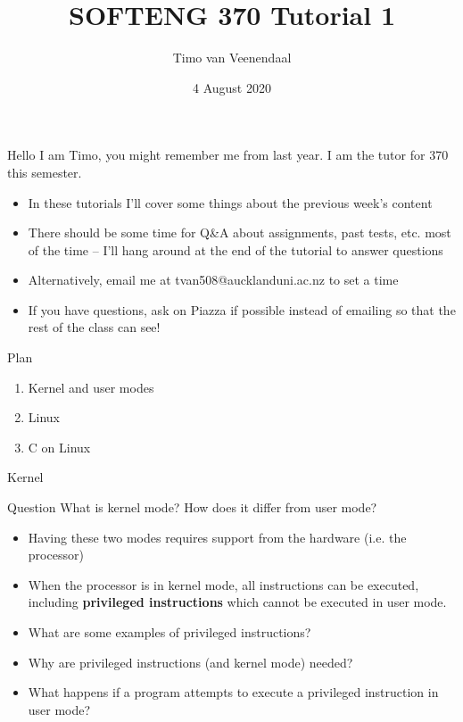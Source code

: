 \documentclass[notes]{beamer}
\title{SOFTENG 370 Tutorial 1}
\author{Timo van Veenendaal}
\date{4 August 2020}
\begin{document}
\maketitle

\begin{frame}{Hello}
I am Timo, you might remember me from last year. I am the tutor for 370 this semester.
    \begin{itemize}
        \item In these tutorials I'll cover some things about the previous week's content
        \item There should be some time for Q\&A about assignments, past tests, etc. most of the time -- I'll hang around at the end of the tutorial to answer questions
        \item Alternatively, email me at tvan508@aucklanduni.ac.nz to set a time
        \item If you have questions, ask on Piazza if possible instead of emailing so that the rest of the class can see!
    \end{itemize}
\end{frame}
\begin{frame}{Plan}
    \begin{enumerate}
        \item Kernel and user modes
        \item Linux
        \item C on Linux
    \end{enumerate}
\end{frame}
\begin{frame}{Kernel}
    \begin{alertblock}{Question}
    What is kernel mode? How does it differ from user mode?
    \end{alertblock}
    \pause
    \begin{itemize}
        \item Having these two modes requires support from the hardware (i.e. the processor)
        \item When the processor is in kernel mode, all instructions can be executed, including  \textbf{privileged instructions} which cannot be executed in user mode.
        \item What are some examples of privileged instructions?
        \item Why are privileged instructions (and kernel mode) needed?
        \item What happens if a program attempts to execute a privileged instruction in user mode?
    \end{itemize}
\end{frame}
\end{document}

